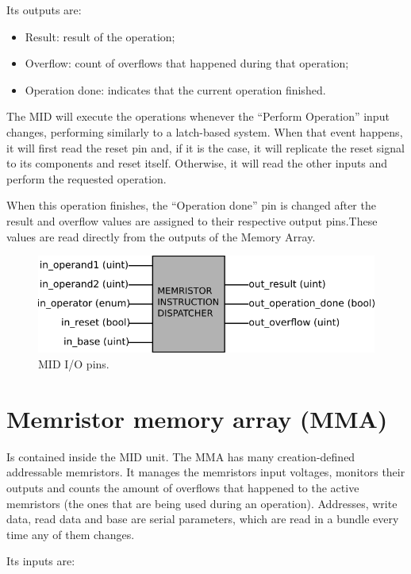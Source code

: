 \documentclass[ecp,tc,english]{iiufrgs}
\begin{document}
Its outputs are:

\begin{itemize}
    \item Result: result of the operation;
    \item Overflow: count of overflows that happened during that operation;
    \item Operation done: indicates that the current operation finished.
\end{itemize}

The MID will execute the operations whenever the “Perform Operation” input changes, performing similarly to a latch-based system. When that event happens, it will first read the reset pin and, if it is the case, it will replicate the reset signal to its components and reset itself. Otherwise, it will read the other inputs and perform the requested operation.

When this operation finishes, the “Operation done” pin is changed after the result and overflow values are assigned to their respective output pins.These values are read directly from the outputs of the Memory Array.

\begin{figure}
  \caption{MID I/O pins.}
  \centerline{\includegraphics{fig/mid.png}}
  \label{fig:mid}
\end{figure}

\section{Memristor memory array (MMA)}

Is contained inside the MID unit. The MMA has many creation-defined addressable memristors. It manages the memristors input voltages, monitors their outputs and counts the amount of overflows that happened to the active memristors (the ones that are being used during an operation). Addresses, write data, read data and base are serial parameters, which are read in a bundle every time any of them changes.

Its inputs are:
\end{document}
